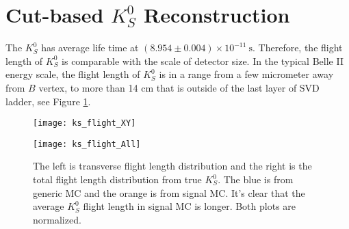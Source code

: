  \section{Cut-based $K_S^0$ Reconstruction}
 
 The $K_S^0$ has average life time at $(8.954 \pm 0.004) \times 10 ^{-11} \:\text{s}$. Therefore, the flight length of $K_S^0$ is comparable with the scale of detector size. In the typical Belle II energy scale, the flight length of $K_S^0$ is in a range from a few micrometer away from $B$ vertex, to more than 14 cm that is outside of the last layer of SVD ladder, see Figure \ref{fig:ks_flight}.

 \begin{figure}[htpb]
 	\centering 
 	\begin{minipage}[t]{0.45\linewidth}
 	\texttt{[image: ks\_flight\_XY]}
 	\end{minipage}
	\begin{minipage}[t]{0.45\linewidth}
		\texttt{[image: ks\_flight\_All]}
	\end{minipage}
 	\caption{The left is transverse flight length distribution and the right is the total flight length distribution from true $K_S^0$.  The blue is from generic MC and  the orange is from signal MC. It's clear that the average $K_S^0$ flight length in signal MC is longer. Both plots are normalized.}
 	\label{fig:ks_flight}
 \end{figure}
 
